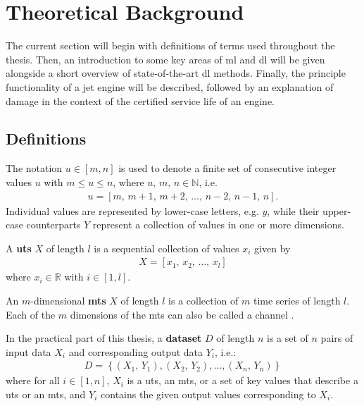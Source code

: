 \chapter{Theoretical Background} \label{sec:theory}
The current section will begin with definitions of terms used throughout the thesis. Then, an introduction to some key areas of \ac{ml} and \ac{dl} will be given alongside a short overview of state-of-the-art \ac{dl} methods. Finally, the principle functionality of a jet engine will be described, followed by an explanation of damage in the context of the certified service life of an engine.

\section{Definitions}
The notation \(u \in \left[m, n\right]\) is used to denote a finite set of consecutive integer values \(u\) with \(m \leq u \leq n\), where \(u,\,m,\,n \in \mathbb{N}\), i.e.
\begin{align}
    u = \left[m,\,m+1,\,m+2,\,\ldots,\,n-2,\,n-1,\,n\right].
\end{align}
Individual values are represented by lower-case letters, e.g. \(y\), while their upper-case counterparts \(Y\) represent a collection of values in one or more dimensions.

A \textbf{\ac{uts}} \(X\) of length \(l\) is a sequential collection of values \(x_{i}\) given by
\begin{align}
    X = \left[x_{1},\,x_{2},\,\ldots,\,x_{l}\right]
\end{align}
where \(x_{i} \in \mathbb{R}\) with \(i \in \left[1, l\right]\).

An \(m\)-dimensional \textbf{\ac{mts}} \(X\) of length \(l\) is a collection of \(m\) time series of length \(l\). Each of the \(m\) dimensions of the \ac{mts} can also be called a channel \cite[]{ismail_fawaz_deep_2019}.

In the practical part of this thesis, a \textbf{dataset} \(D\) of length \(n\) is a set of \(n\) pairs of input data \(X_i\) and corresponding output data \(Y_i\), i.e.:
\begin{align}
    D = \left\{\left(X_1,\,Y_1\right), \left(X_2,\,Y_2\right), \ldots, \left(X_n,\,Y_n\right)\right\}
\end{align}
where for all \(i \in \left[1, n\right]\), \(X_i\) is a \ac{uts}, an \ac{mts}, or a set of key values that describe a \ac{uts} or an \ac{mts}, and \(Y_i\) contains the given output values corresponding to \(X_i\).

